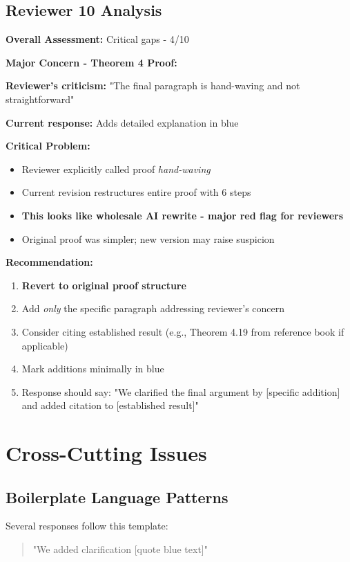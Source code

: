 \documentclass[11pt]{article}
\begin{document}
\subsection{Reviewer 10 Analysis}

\textbf{Overall Assessment:} \textcolor{critical}{Critical gaps - 4/10}

\textbf{Major Concern - Theorem 4 Proof:}

\textbf{Reviewer's criticism:} "The final paragraph is hand-waving and not straightforward"

\textbf{Current response:} Adds detailed explanation in blue

\textbf{\textcolor{critical}{Critical Problem:}}
\begin{itemize}[leftmargin=*]
\item Reviewer explicitly called proof \textit{hand-waving}
\item Current revision restructures entire proof with 6 steps
\item \textbf{This looks like wholesale AI rewrite - major red flag for reviewers}
\item Original proof was simpler; new version may raise suspicion
\end{itemize}

\textbf{Recommendation:}
\begin{enumerate}
\item \textbf{Revert to original proof structure}
\item Add \textit{only} the specific paragraph addressing reviewer's concern
\item Consider citing established result (e.g., Theorem 4.19 from reference book if applicable)
\item Mark additions minimally in blue
\item Response should say: "We clarified the final argument by [specific addition] and added citation to [established result]"
\end{enumerate}

\section{Cross-Cutting Issues}

\subsection{Boilerplate Language Patterns}

Several responses follow this template:
\begin{quote}
"We added clarification [quote blue text]"
\end{quote}
\end{document}
